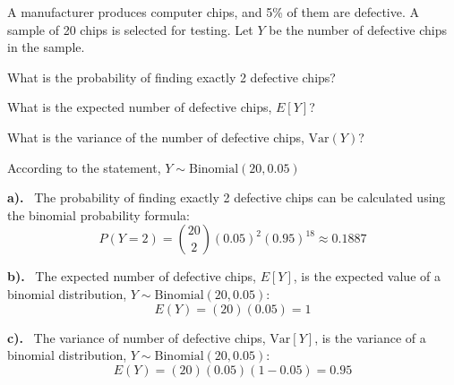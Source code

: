 \documentclass[a4paper, 10pt]{article}
\begin{document}
\begin{tosubmit}
\problem
A manufacturer produces computer chips, and 5\% of them are defective.
A sample of 20 chips is selected for testing.
Let \( Y \) be the number of defective chips in the sample.
\begin{subproblems}
    \item What is the probability of finding exactly 2 defective chips?
    \item What is the expected number of defective chips, \( E[Y] \)?
    \item What is the variance of the number of defective chips, \( \text{Var}(Y) \)?
\end{subproblems}

\par\noindent\submitsolution According to the statement, \( Y \sim \text{Binomial}(20, 0.05) \)

\vspace{2mm}

\par\noindent\textbf{a).} \, The probability of finding exactly 2 defective chips
can be calculated using the binomial probability formula:
\[
    P(Y = 2) = \binom{20}{2} (0.05)^{2} (0.95)^{18} \approx \boxed{0.1887}
\]

\vspace{2mm}

\par\noindent\textbf{b).} \, The expected number of defective chips, \( E[Y] \),
is the expected value of a binomial distribution, \( Y \sim \text{Binomial}(20, 0.05) \):
\[
    E(Y) = (20)(0.05) = \boxed{1}
\]

\vspace{2mm}

\par\noindent\textbf{c).} \, The variance of  number of defective chips, \( \text{Var}[Y] \),
is the variance of a binomial distribution, \( Y \sim \text{Binomial}(20, 0.05) \):
\[
    E(Y) = (20)(0.05)(1-0.05) = \boxed{0.95}
\]
\end{tosubmit}

\pagebreak
\end{document}
